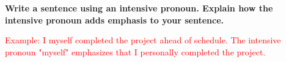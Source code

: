 \documentclass[12pt]{article}
\begin{document}
\vspace{1em}

\begin{tcolorbox}[colframe=black!60, colback=white, 
coltitle=black, colbacktitle=black!15, fonttitle=\bfseries\Large, 
title=Exit Ticket, halign title=center, left=10pt, right=10pt, top=5pt, bottom=15pt]

\textbf{Write a sentence using an intensive pronoun. Explain how the intensive pronoun adds emphasis to your sentence.}

\textcolor{red}{Example: I myself completed the project ahead of schedule. The intensive pronoun "myself" emphasizes that I personally completed the project.}

\end{tcolorbox}
\end{document}
